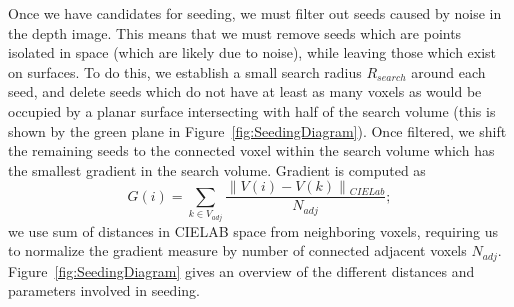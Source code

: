 Once we have candidates for seeding, we must filter out seeds caused by noise in the depth image. This means that we must remove seeds which are points isolated in space (which are likely due to noise), while leaving those which exist on surfaces. To do this, we establish a small search radius ${R}_{search}$ around each seed, and delete seeds which do not have at least as many voxels as would be occupied by a planar surface intersecting with half of the search volume (this is shown by the green plane in Figure~\ref{fig:SeedingDiagram}). Once filtered, we shift the remaining seeds to the connected voxel within the search volume which has the smallest gradient in the search volume. Gradient is computed as
\begin{equation} \label{eqn:Gradient}
\mathit{G}(i) = \sum_{k\in{V}_{adj}}{\frac{\parallel{V(i)-V(k)}\parallel{}_{CIELab}}{{N}_{adj}}};
\end{equation}
we use sum of distances in CIELAB space from neighboring voxels, requiring us to normalize the gradient measure by number of connected adjacent voxels ${N}_{adj}$. Figure~\ref{fig:SeedingDiagram} gives an overview of the different distances and parameters involved in seeding.

